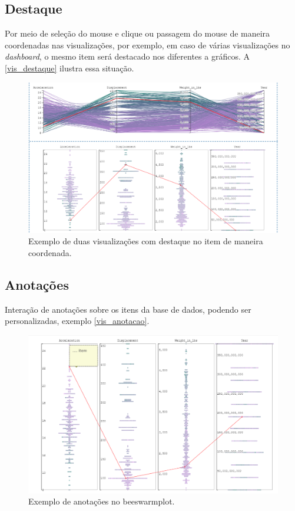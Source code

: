 \documentclass[
	12pt,				%
	openright,			%
	oneside,			%
	a4paper,			%
	english,			%
	brazil				%
	]{abntex2}
\begin{document}
\subsection{Destaque}
Por meio de seleção do mouse e clique ou passagem do mouse de maneira coordenadas nas visualizações, por exemplo, em caso de várias visualizações no \textit{dashboard}, o mesmo item será destacado nos diferentes a gráficos. A \autoref{vis_destaque} ilustra essa situação.
\begin{figure}[h]
	\caption{\label{vis_destaque} Exemplo de duas visualizações com destaque no item de maneira coordenada.
}
	\begin{center}
	    \includegraphics[width=35pc,scale=1]{figures/cordinate_highliht.png}
	\end{center}
\end{figure}

\subsection{Anotações}
Interação de anotações sobre os itens da base de dados, podendo ser personalizadas, exemplo \autoref{vis_anotacao}.

\begin{figure}[h]
	\caption{\label{vis_anotacao} Exemplo de anotações no beeswarmplot.
}
	\begin{center}
	    \includegraphics[width=35pc,scale=1]{figures/anottation.png}
	\end{center}
\end{figure}
\end{document}
